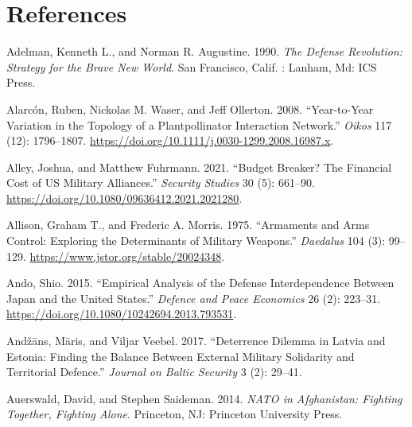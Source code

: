 \documentclass[
  12,
  letterpaper,
  DIV=11,
  numbers=noendperiod]{scrartcl}
\newlength{\cslhangindent}
\newlength{\cslentryspacingunit} %
\newenvironment{CSLReferences}[2] %
 {%
  \setlength{\parindent}{0pt}
  \ifodd #1
  \let\oldpar\par
  \def\par{\hangindent=\cslhangindent\oldpar}
  \fi
  \setlength{\parskip}{#2\cslentryspacingunit}
 }%
 {}
\begin{document}
\newpage

\hypertarget{references}{%
\section*{References}\label{references}}

\hypertarget{refs}{}
\begin{CSLReferences}{1}{0}
\leavevmode{}%
Adelman, Kenneth L., and Norman R. Augustine. 1990. \emph{The Defense
Revolution: Strategy for the Brave New World}. {San Francisco, Calif. :
Lanham, Md}: {ICS Press}.

\leavevmode{}%
Alarcón, Ruben, Nickolas M. Waser, and Jeff Ollerton. 2008.
{``Year-to-Year Variation in the Topology of a
Plant\textendash pollinator Interaction Network.''} \emph{Oikos} 117
(12): 1796--1807.
\url{https://doi.org/10.1111/j.0030-1299.2008.16987.x}.

\leavevmode{}%
Alley, Joshua, and Matthew Fuhrmann. 2021. {``Budget {Breaker}? {The
Financial Cost} of {US Military Alliances}.''} \emph{Security Studies}
30 (5): 661--90. \url{https://doi.org/10.1080/09636412.2021.2021280}.

\leavevmode{}%
Allison, Graham T., and Frederic A. Morris. 1975. {``Armaments and {Arms
Control}: {Exploring} the {Determinants} of {Military Weapons}.''}
\emph{Daedalus} 104 (3): 99--129.
\url{https://www.jstor.org/stable/20024348}.

\leavevmode{}%
Ando, Shio. 2015. {``Empirical Analysis of the Defense Interdependence
Between {Japan} and the {United States}.''} \emph{Defence and Peace
Economics} 26 (2): 223--31.
\url{https://doi.org/10.1080/10242694.2013.793531}.

\leavevmode{}%
Andžāns, Māris, and Viljar Veebel. 2017. {``Deterrence {Dilemma} in
{Latvia} and {Estonia}: {Finding} the {Balance} Between {External
Military Solidarity} and {Territorial Defence}.''} \emph{Journal on
Baltic Security} 3 (2): 29--41.

\leavevmode{}%
Auerswald, David, and Stephen Saideman. 2014. \emph{{NATO} in
{Afghanistan}: {Fighting Together}, {Fighting Alone}}. {Princeton, NJ}:
{Princeton University Press}.


\end{CSLReferences}
\end{document}
